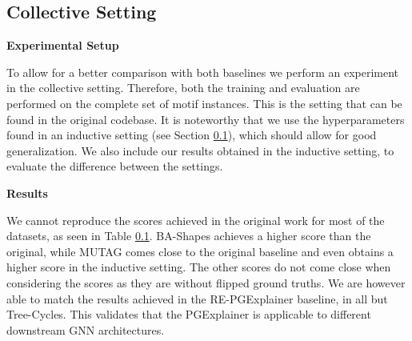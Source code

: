 \subsection{Collective Setting}

\textbf{Experimental Setup} \par
To allow for a better comparison with both baselines we perform an experiment in the collective setting. Therefore, both the training and evaluation are performed on the complete set of motif instances. This is the setting that can be found in the original codebase. It is noteworthy that we use the hyperparameters found in an inductive setting (see Section \ref{}), which should allow for good generalization. We also include our results obtained in the inductive setting, to evaluate the difference between the settings. \bigskip

\textbf{Results}\par

We cannot reproduce the scores achieved in the original work for most of the datasets, as seen in Table \ref{}. BA-Shapes achieves a higher score than the original, while MUTAG comes close to the original baseline and even obtains a higher score in the inductive setting. The other scores do not come close when considering the scores as they are without flipped ground truths. We are however able to match the results achieved in the RE-PGExplainer baseline, in all but Tree-Cycles. This validates that the PGExplainer is applicable to different downstream GNN architectures.

